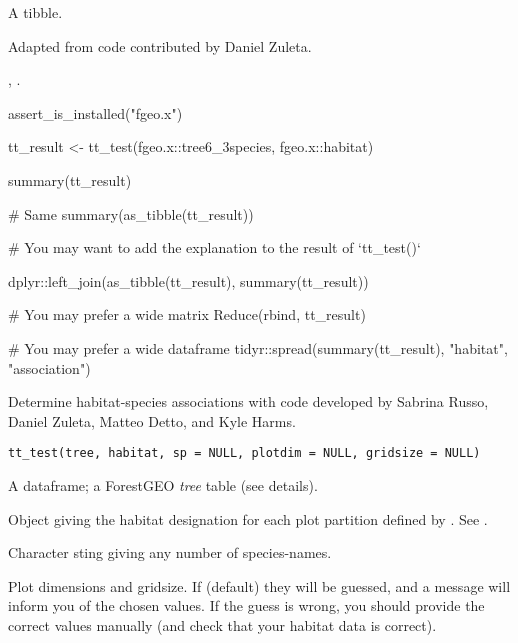 \documentclass[a4paper]{book}
\begin{document}
%
\begin{Value}
A tibble.
\end{Value}
%
\begin{Author}\relax
Adapted from code contributed by Daniel Zuleta.
\end{Author}
%
\begin{SeeAlso}\relax
{}, .
\end{SeeAlso}
%
\begin{Examples}
\begin{ExampleCode}
assert_is_installed("fgeo.x")

tt_result <- tt_test(fgeo.x::tree6_3species, fgeo.x::habitat)

summary(tt_result)

# Same
summary(as_tibble(tt_result))

# You may want to add the explanation to the result of `tt_test()`

dplyr::left_join(as_tibble(tt_result), summary(tt_result))

# You may prefer a wide matrix
Reduce(rbind, tt_result)

# You may prefer a wide dataframe
tidyr::spread(summary(tt_result), "habitat", "association")
\end{ExampleCode}
\end{Examples}
%
\begin{Description}\relax
Determine habitat-species associations with code developed by Sabrina Russo,
Daniel Zuleta, Matteo Detto, and Kyle Harms.
\end{Description}
%
\begin{Usage}
\begin{verbatim}
tt_test(tree, habitat, sp = NULL, plotdim = NULL, gridsize = NULL)
\end{verbatim}
\end{Usage}
%
\begin{Arguments}
\begin{ldescription}
\item[\code{tree}] A dataframe; a ForestGEO \emph{tree} table (see details).

\item[\code{habitat}] Object giving the habitat designation for each
plot partition defined by . See .

\item[\code{sp}] Character sting giving any number of species-names.

\item[\code{plotdim, gridsize}] Plot dimensions and gridsize. If  (default)
they will be guessed, and a message will inform you of the chosen values.
If the guess is wrong, you should provide the correct values manually (and
check that your habitat data is correct).
\end{ldescription}
\end{Arguments}
\end{document}

